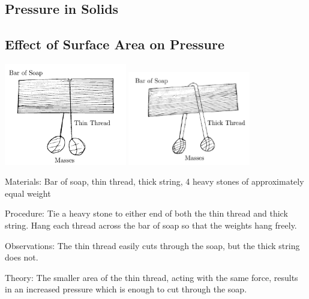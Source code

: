 \begin{multicols}{2}
\columnbreak


\section*{Pressure in Solids}


\subsection{Effect of Surface Area on Pressure}

\begin{center}
\includegraphics[width=0.4\textwidth]{./img/pressure-solid1.png}
\includegraphics[width=0.4\textwidth]{./img/pressure-solid2.png}
\end{center}

\begin{description*}
\item[Materials:]{Bar of soap, thin thread, thick string, 4 heavy stones of approximately equal weight}
\item[Procedure:]{Tie a heavy stone to either end of both the thin thread and thick string. Hang each thread across the bar of soap so that the weights hang freely.}
\item[Observations:]{The thin thread easily cuts through the soap, but the thick string does not.}
\item[Theory:]{The smaller area of the thin thread, acting with the same force, results in an increased pressure which is enough to cut through the soap.}
\end{description*}


\end{multicols}
